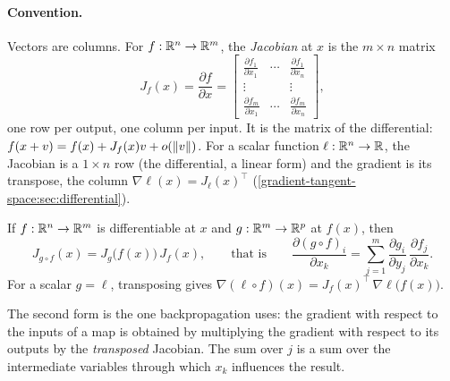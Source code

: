\begin{notechapter}
\paragraph{Convention.} Vectors are columns. For $f:\mathbb{R}^n\to\mathbb{R}^m$, the \emph{Jacobian} at $x$ is the
$m\times n$ matrix
\[
  J_f(x) = \frac{\partial f}{\partial x} = \begin{bmatrix}
    \frac{\partial f_1}{\partial x_1} & \cdots & \frac{\partial f_1}{\partial x_n}\\
    \vdots & & \vdots\\
    \frac{\partial f_m}{\partial x_1} & \cdots & \frac{\partial f_m}{\partial x_n}
  \end{bmatrix},
\]
one row per output, one column per input. It is the matrix of the differential:
$f(x + v) = f(x) + J_f(x)v + o(\left\|v\right\|)$. For a scalar function $\ell:\mathbb{R}^n\to\mathbb{R}$, the Jacobian is a $1\times n$
row (the differential, a linear form) and the gradient is its transpose, the column
$\nabla\ell(x) = J_\ell(x)^\top$ (\cref{gradient-tangent-space:sec:differential}).

\begin{theorem}\label{backpropagation:thm:chain}
If $f:\mathbb{R}^n\to\mathbb{R}^m$ is differentiable at $x$ and $g:\mathbb{R}^m\to\mathbb{R}^p$ at $f(x)$, then
\[
  J_{g\circ f}(x) = J_g\bigl(f(x)\bigr)\,J_f(x),\qquad\text{that is}\qquad
  \frac{\partial(g\circ f)_i}{\partial x_k} = \sum_{j=1}^m\frac{\partial g_i}{\partial y_j}\,\frac{\partial f_j}{\partial x_k} .
\]
For a scalar $g = \ell$, transposing gives $\nabla(\ell\circ f)(x) = J_f(x)^\top\,\nabla\ell\bigl(f(x)\bigr)$.
\end{theorem}

The second form is the one backpropagation uses: the gradient with respect to the inputs of
a map is obtained by multiplying the gradient with respect to its outputs by the
\emph{transposed} Jacobian. The sum over $j$ is a sum over the intermediate variables
through which $x_k$ influences the result.


\end{notechapter}
